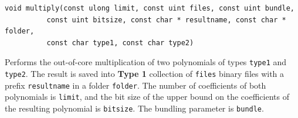 \documentclass[a4paper,10pt]{article}
\newcommand{\code}{\lstinline}
\begin{document}
\begin{lstlisting}
void multiply(const ulong limit, const uint files, const uint bundle,
	      const uint bitsize, const char * resultname, const char * folder,
	      const char type1, const char type2)
\end{lstlisting}

Performs the out-of-core multiplication of two polynomials of types \code{type1} and \code{type2}. The result is saved into \textbf{Type 1} collection of \texttt{files} binary files with a prefix \code{resultname} in a folder \code{folder}. The number of coefficients of both polynomials is \code{limit}, and the bit size of the upper bound on the coefficients of the resulting polynomial is \code{bitsize}. The bundling parameter is \code{bundle}.
\end{document}

